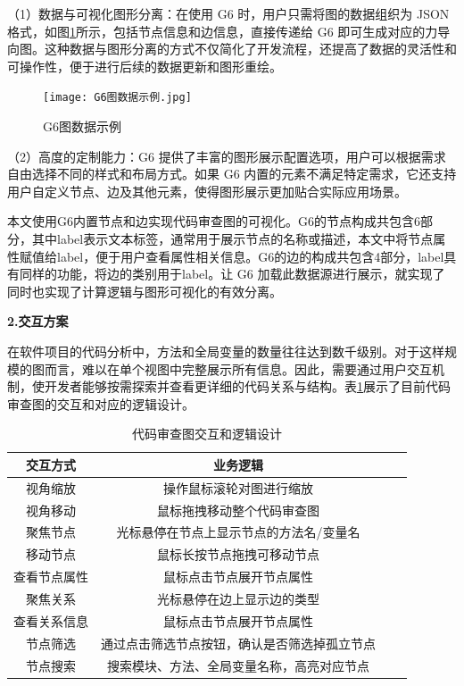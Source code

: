 （1）数据与可视化图形分离：在使用 G6 时，用户只需将图的数据组织为 JSON 格式，如图\ref{4_G6图数据示例}所示，包括节点信息和边信息，直接传递给 G6 即可生成对应的力导向图。这种数据与图形分离的方式不仅简化了开发流程，还提高了数据的灵活性和可操作性，便于进行后续的数据更新和图形重绘。

\begin{figure}[h]
\centering
\texttt{[image: G6图数据示例.jpg]}
\caption{G6图数据示例}
\label{4_G6图数据示例}
\end{figure}

（2）高度的定制能力：G6 提供了丰富的图形展示配置选项，用户可以根据需求自由选择不同的样式和布局方式。如果 G6 内置的元素不满足特定需求，它还支持用户自定义节点、边及其他元素，使得图形展示更加贴合实际应用场景。

本文使用G6内置节点和边实现代码审查图的可视化。G6的节点构成共包含6部分，其中label表示文本标签，通常用于展示节点的名称或描述，本文中将节点属性赋值给label，便于用户查看属性相关信息。G6的边的构成共包含4部分，label具有同样的功能，将边的类别用于label。让 G6 加载此数据源进行展示，就实现了同时也实现了计算逻辑与图形可视化的有效分离。

\noindent \textbf{2.交互方案}

在软件项目的代码分析中，方法和全局变量的数量往往达到数千级别。对于这样规模的图而言，难以在单个视图中完整展示所有信息。因此，需要通过用户交互机制，使开发者能够按需探索并查看更详细的代码关系与结构。表\ref{4_代码审查图交互和逻辑设计}展示了目前代码审查图的交互和对应的逻辑设计。


\begin{table}[htbp]
\caption{代码审查图交互和逻辑设计}
\label{4_代码审查图交互和逻辑设计}
\vspace{0.5em}\centering\wuhao
\begin{tabular}{cccc}
\toprule
交互方式 & 业务逻辑 \\
\midrule
视角缩放 & 操作鼠标滚轮对图进行缩放  \\
视角移动 & 鼠标拖拽移动整个代码审查图   \\
聚焦节点 & 光标悬停在节点上显示节点的方法名/变量名  \\
移动节点 & 鼠标长按节点拖拽可移动节点 \\
查看节点属性 & 鼠标点击节点展开节点属性  \\
聚焦关系 & 光标悬停在边上显示边的类型  \\
查看关系信息 & 鼠标点击节点展开节点属性  \\
节点筛选 & 通过点击筛选节点按钮，确认是否筛选掉孤立节点 \\
节点搜索 & 搜索模块、方法、全局变量名称，高亮对应节点 \\
\bottomrule
\end{tabular}
\end{table}


